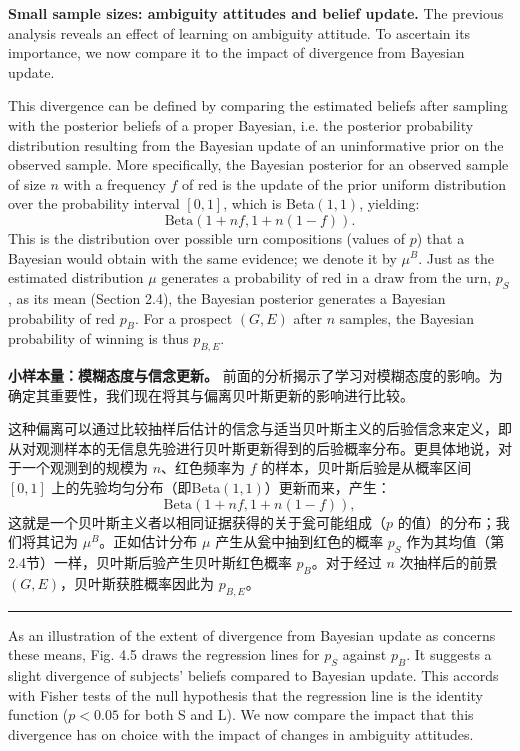 \documentclass[12pt,a4paper]{article}
\newenvironment{original}
  {\par\vspace{0.5em}\noindent\color{black}\ignorespaces}
  {\par\vspace{0.3em}}
\newenvironment{translation}
  {\par\noindent\color{transblue}\ignorespaces}
  {\par\vspace{0.8em}\hrule\vspace{0.5em}}
\begin{document}
\begin{original}
\textbf{Small sample sizes: ambiguity attitudes and belief update.} The previous analysis reveals an effect of learning on ambiguity attitude. To ascertain its importance, we now compare it to the impact of divergence from Bayesian update.

This divergence can be defined by comparing the estimated beliefs after sampling with the posterior beliefs of a proper Bayesian, i.e. the posterior probability distribution resulting from the Bayesian update of an uninformative prior on the observed sample. More specifically, the Bayesian posterior for an observed sample of size $n$ with a frequency $f$ of red is the update of the prior uniform distribution over the probability interval $[0, 1]$, which is Beta$(1, 1)$, yielding:
\begin{equation}
\text{Beta}(1 + nf, 1 + n(1 - f)). \label{eq:bayespost}
\end{equation}
This is the distribution over possible urn compositions (values of $p$) that a Bayesian would obtain with the same evidence; we denote it by $\mu^B$. Just as the estimated distribution $\mu$ generates a probability of red in a draw from the urn, $p_S$, as its mean (Section 2.4), the Bayesian posterior generates a Bayesian probability of red $p_B$. For a prospect $(G, E)$ after $n$ samples, the Bayesian probability of winning is thus $p_{B,E}$.
\end{original}

\begin{translation}
\textbf{小样本量：模糊态度与信念更新。} 前面的分析揭示了学习对模糊态度的影响。为确定其重要性，我们现在将其与偏离贝叶斯更新的影响进行比较。

这种偏离可以通过比较抽样后估计的信念与适当贝叶斯主义的后验信念来定义，即从对观测样本的无信息先验进行贝叶斯更新得到的后验概率分布。更具体地说，对于一个观测到的规模为 $n$、红色频率为 $f$ 的样本，贝叶斯后验是从概率区间 $[0, 1]$ 上的先验均匀分布（即Beta$(1, 1)$）更新而来，产生：
\begin{equation}
\text{Beta}(1 + nf, 1 + n(1 - f)),
\end{equation}
这就是一个贝叶斯主义者以相同证据获得的关于瓮可能组成（$p$ 的值）的分布；我们将其记为 $\mu^B$。正如估计分布 $\mu$ 产生从瓮中抽到红色的概率 $p_S$ 作为其均值（第2.4节）一样，贝叶斯后验产生贝叶斯红色概率 $p_B$。对于经过 $n$ 次抽样后的前景 $(G, E)$，贝叶斯获胜概率因此为 $p_{B,E}$。
\end{translation}

\begin{original}
As an illustration of the extent of divergence from Bayesian update as concerns these means, Fig. 4.5 draws the regression lines for $p_S$ against $p_B$. It suggests a slight divergence of subjects' beliefs compared to Bayesian update. This accords with Fisher tests of the null hypothesis that the regression line is the identity function ($p < 0.05$ for both S and L). We now compare the impact that this divergence has on choice with the impact of changes in ambiguity attitudes.
\end{original}
\end{document}
